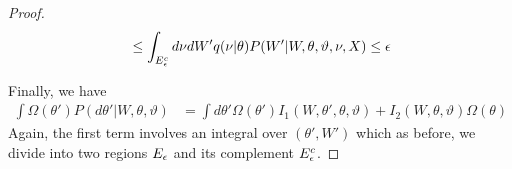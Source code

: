\begin{proof}
\begin{align*}
  &\le \int_{E^c_{\epsilon}} d\nu dW'
  q(\nu | \theta) P(W' | W, \theta, \vartheta, \nu, X) \le \epsilon \\
\end{align*}

Finally, we have
\begin{align*}
  \int \Omega(\theta') P(d\theta'| W, \theta, \vartheta)
  &= \int d\theta' \Omega(\theta') I_1(W, \theta', \theta, \vartheta) + I_2(W, \theta, \vartheta) \Omega(\theta)
\end{align*}
Again, the first term involves an integral over $(\theta',W')$ which as
before, we divide into two regions $E_\epsilon$ and its complement
$E^c_\epsilon$.


\end{proof}

